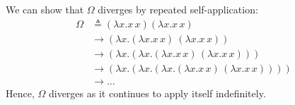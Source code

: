   \begin{Example}

    \noindent
    We can show that \(\Omega\) diverges by repeated self-application:
    \begin{align*}
      \Omega &\triangleq (\lambda x. x\,x)(\lambda x. x\,x) \\
      &\rightarrow (\lambda x. (\lambda x. x\,x)\ (\lambda x. x\,x)) \\
      &\rightarrow (\lambda x. (\lambda x. (\lambda x. x\,x)\,(\lambda x. x\,x))) \\
      &\rightarrow (\lambda x. (\lambda x. (\lambda x. (\lambda x. x\,x)\,(\lambda x. x\,x)))) \\
      &\rightarrow \ldots
    \end{align*}
    \noindent
    Hence, \(\Omega\) diverges as it continues to apply itself indefinitely.
\end{Example}

\newpage 

